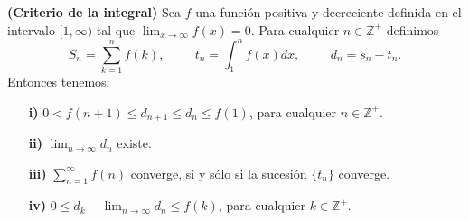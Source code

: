 \begin{theorem}\textbf{(Criterio de la integral)}
  Sea $f$ una función positiva y decreciente definida en el intervalo $[1,\infty)$ tal que $\lim_{x\to\infty}f(x)=0$. Para cualquier $n\in\mathbb{Z}^+$ definimos
  \begin{equation*}
    S_n=\sum_{k=1}^{n}f(k),\hspace{1cm} t_n=\int_{1}^{n}f(x)dx,\hspace{1cm} d_n=s_n-t_n.
  \end{equation*}
  Entonces tenemos:
  \begin{itemize}
    \item[\textbf{i)}] $0<f(n+1)\leq d_{n+1}\leq d_n \leq f(1)$, para cualquier $n\in\mathbb{Z}^+$.
    \item[\textbf{ii)}] $\lim_{n\to\infty}d_n$ existe.
    \item[\textbf{iii)}] $\sum_{n=1}^\infty f(n)$ converge, si y sólo si la sucesión $\lbrace{t_n\rbrace}$ converge.
    \item[\textbf{iv)}] $0\leq d_k-\lim_{n\to\infty} d_n\leq f(k)$, para cualquier $k\in\mathbb{Z}^+$.
  \end{itemize}
\end{theorem}
